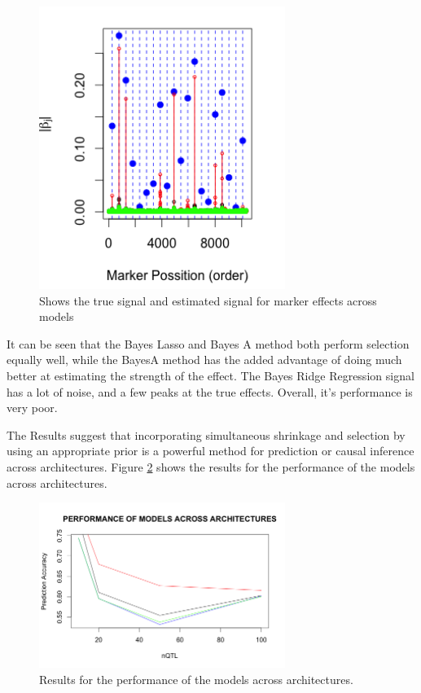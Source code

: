 \documentclass{sig-alternate-05-2015}
\begin{document}
\begin{figure}
  \includegraphics[width=8cm]{./Images/sim2_2.png}
  \centering
  \caption{ Shows the true signal and estimated signal for marker effects across models}
  \label{fig:sim2_2}
\end{figure}

It can be seen that the Bayes Lasso and Bayes A method both perform selection equally well, while the BayesA method has the added advantage of
doing much better at estimating the strength of the effect. The Bayes Ridge Regression signal has a lot of noise, and a few peaks at the true effects.
Overall, it's performance is very poor.

The Results suggest that incorporating simultaneous shrinkage and selection by using an appropriate prior
is a powerful method for prediction or causal inference across architectures. Figure \ref{fig:simfinal} shows the results for the performance of the models across
architectures.


\begin{figure}
  \includegraphics[width=8cm]{./Images/simplot_final.png}
  \centering
  \caption{ Results for the performance of the models across architectures.}
  \label{fig:simfinal}
\end{figure}
\end{document}
